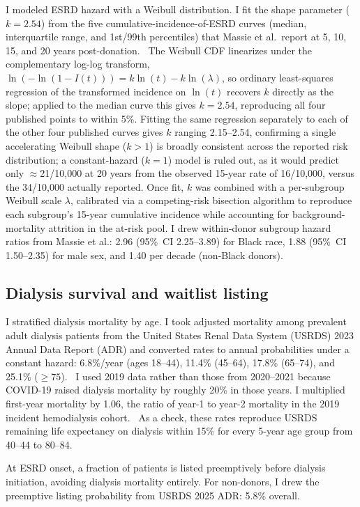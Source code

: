 I modeled ESRD hazard with a Weibull distribution. I fit the shape parameter ($k = 2.54$) from the five cumulative-incidence-of-ESRD curves (median, interquartile range, and 1st/99th percentiles) that Massie et al.\ report at 5, 10, 15, and 20 years post-donation.~\cite{massie_quantifying_2017} The Weibull CDF linearizes under the complementary log-log transform, $\ln(-\ln(1-I(t))) = k\ln(t) - k\ln(\lambda)$, so ordinary least-squares regression of the transformed incidence on $\ln(t)$ recovers $k$ directly as the slope; applied to the median curve this gives $k=2.54$, reproducing all four published points to within 5\%. Fitting the same regression separately to each of the other four published curves gives $k$ ranging 2.15--2.54, confirming a single accelerating Weibull shape ($k>1$) is broadly consistent across the reported risk distribution; a constant-hazard ($k=1$) model is ruled out, as it would predict only $\approx$21/10,000 at 20 years from the observed 15-year rate of 16/10,000, versus the 34/10,000 actually reported. Once fit, $k$ was combined with a per-subgroup Weibull scale $\lambda$, calibrated via a competing-risk bisection algorithm to reproduce each subgroup's 15-year cumulative incidence while accounting for background-mortality attrition in the at-risk pool. I drew within-donor subgroup hazard ratios from Massie et al.: 2.96 (95\%~CI 2.25--3.89) for Black race, 1.88 (95\%~CI 1.50--2.35) for male sex, and 1.40 per decade (non-Black donors).~\cite{massie_quantifying_2017}

\subsection{Dialysis survival and waitlist listing}
I stratified dialysis mortality by age. I took adjusted mortality among prevalent adult dialysis patients from the United States Renal Data System (USRDS) 2023 Annual Data Report (ADR) and converted rates to annual probabilities under a constant hazard: 6.8\%/year (ages 18--44), 11.4\% (45--64), 17.8\% (65--74), and 25.1\% ($\geq 75$).~\cite{usrds_2023} I used 2019 data rather than those from 2020--2021 because COVID-19 raised dialysis mortality by roughly 20\% in those years. I multiplied first-year mortality by 1.06, the ratio of year-1 to year-2 mortality in the 2019 incident hemodialysis cohort.~\cite{usrds_2023} As a check, these rates reproduce USRDS remaining life expectancy on dialysis within 15\% for every 5-year age group from 40--44 to 80--84.

At ESRD onset, a fraction of patients is listed preemptively before dialysis initiation, avoiding dialysis mortality entirely. For non-donors, I drew the preemptive listing probability from USRDS 2025 ADR: 5.8\% overall.~\cite{usrds_2025}

